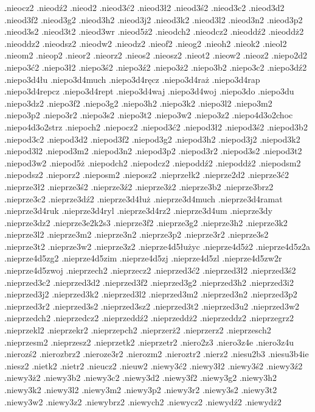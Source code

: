 {.nieocz2
.nieodź2
.nieod2
.nieod3ć2
.nieod3ł2
.nieod3ś2
.nieod3c2
.nieod3d2
.nieod3f2
.nieod3g2
.nieod3h2
.nieod3j2
.nieod3k2
.nieod3l2
.nieod3n2
.nieod3p2
.nieod3s2
.nieod3t2
.nieod3wr
.nieod5ż2
.nieodch2
.nieodcz2
.nieoddź2
.nieoddż2
.nieoddz2
.nieodsz2
.nieodw2
.nieodz2
.nieof2
.nieog2
.nieoh2
.nieok2
.nieol2
.nieom2
.nieop2
.nieor2
.nieorz2
.nieos2
.nieosz2
.nieot2
.nieow2
.nieoz2
.niepo2d2
.niepo3ć2
.niepo3ł2
.niepo3ś2
.niepo3ź2
.niepo3ż2
.niepo3b2
.niepo3c2
.niepo3dź2
.niepo3d4łu
.niepo3d4much
.niepo3d4ręcz
.niepo3d4raż
.niepo3d4rap
.niepo3d4repcz
.niepo3d4rept
.niepo3d4waj
.niepo3d4woj
.niepo3do
.niepo3du
.niepo3dz2
.niepo3f2
.niepo3g2
.niepo3h2
.niepo3k2
.niepo3l2
.niepo3m2
.niepo3p2
.niepo3r2
.niepo3s2
.niepo3t2
.niepo3w2
.niepo3z2
.niepo4d3o2choc
.niepo4d3o2strz
.niepoch2
.niepocz2
.niepod3ć2
.niepod3ł2
.niepod3ś2
.niepod3b2
.niepod3c2
.niepod3d2
.niepod3f2
.niepod3g2
.niepod3h2
.niepod3j2
.niepod3k2
.niepod3l2
.niepod3m2
.niepod3n2
.niepod3p2
.niepod3r2
.niepod3s2
.niepod3t2
.niepod3w2
.niepod5ż
.niepodch2
.niepodcz2
.niepoddź2
.niepoddż2
.niepodsm2
.niepodsz2
.nieporz2
.nieposm2
.nieposz2
.nieprzełk2
.nieprze2d2
.nieprze3ć2
.nieprze3ł2
.nieprze3ś2
.nieprze3ź2
.nieprze3ż2
.nieprze3b2
.nieprze3brz2
.nieprze3c2
.nieprze3dź2
.nieprze3d4łuż
.nieprze3d4much
.nieprze3d4ramat
.nieprze3d4ruk
.nieprze3d4ryl
.nieprze3d4rz2
.nieprze3d4um
.nieprze3dy
.nieprze3dz2
.nieprze3e2k2s3
.nieprze3f2
.nieprze3g2
.nieprze3h2
.nieprze3k2
.nieprze3l2
.nieprze3m2
.nieprze3n2
.nieprze3p2
.nieprze3r2
.nieprze3s2
.nieprze3t2
.nieprze3w2
.nieprze3z2
.nieprze4d5łużyc
.nieprze4d5ż2
.nieprze4d5z2a
.nieprze4d5zg2
.nieprze4d5zim
.nieprze4d5zj
.nieprze4d5zl
.nieprze4d5zw2r
.nieprze4d5zwoj
.nieprzech2
.nieprzecz2
.nieprzed3ć2
.nieprzed3ł2
.nieprzed3ś2
.nieprzed3c2
.nieprzed3d2
.nieprzed3f2
.nieprzed3g2
.nieprzed3h2
.nieprzed3i2
.nieprzed3j2
.nieprzed3k2
.nieprzed3l2
.nieprzed3m2
.nieprzed3n2
.nieprzed3p2
.nieprzed3r2
.nieprzed3s2
.nieprzed3sz2
.nieprzed3t2
.nieprzed3u2
.nieprzed3w2
.nieprzedch2
.nieprzedcz2
.nieprzeddź2
.nieprzeddż2
.nieprzeddz2
.nieprzegrz2
.nieprzekl2
.nieprzekr2
.nieprzepch2
.nieprzerż2
.nieprzerz2
.nieprzesch2
.nieprzesm2
.nieprzesz2
.nieprzetk2
.nieprzetr2
.niero2z3
.niero3z4e
.niero3z4u
.nierozś2
.nierozbrz2
.nieroze3r2
.nierozm2
.nieroztr2
.nierz2
.niesu2b3
.niesu3b4ie
.niesz2
.nietk2
.nietr2
.nieucz2
.nieuw2
.niewy3ć2
.niewy3ł2
.niewy3ś2
.niewy3ź2
.niewy3ż2
.niewy3b2
.niewy3c2
.niewy3d2
.niewy3f2
.niewy3g2
.niewy3h2
.niewy3k2
.niewy3l2
.niewy3m2
.niewy3p2
.niewy3r2
.niewy3s2
.niewy3t2
.niewy3w2
.niewy3z2
.niewybrz2
.niewych2
.niewycz2
.niewydź2
.niewydż2
}
